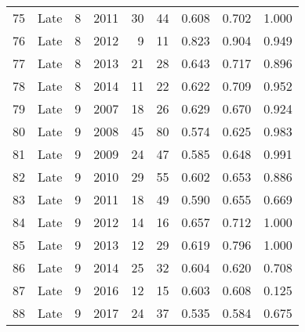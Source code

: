 \begin{table}[ht]
\begin{tabular}{rlllrrrrr}
  75 & Late & 8 & 2011 & 30 & 44 & 0.608 & 0.702 & 1.000 \\ 
  76 & Late & 8 & 2012 & 9 & 11 & 0.823 & 0.904 & 0.949 \\ 
  77 & Late & 8 & 2013 & 21 & 28 & 0.643 & 0.717 & 0.896 \\ 
  78 & Late & 8 & 2014 & 11 & 22 & 0.622 & 0.709 & 0.952 \\ 
  79 & Late & 9 & 2007 & 18 & 26 & 0.629 & 0.670 & 0.924 \\ 
  80 & Late & 9 & 2008 & 45 & 80 & 0.574 & 0.625 & 0.983 \\ 
  81 & Late & 9 & 2009 & 24 & 47 & 0.585 & 0.648 & 0.991 \\ 
  82 & Late & 9 & 2010 & 29 & 55 & 0.602 & 0.653 & 0.886 \\ 
  83 & Late & 9 & 2011 & 18 & 49 & 0.590 & 0.655 & 0.669 \\ 
  84 & Late & 9 & 2012 & 14 & 16 & 0.657 & 0.712 & 1.000 \\ 
  85 & Late & 9 & 2013 & 12 & 29 & 0.619 & 0.796 & 1.000 \\ 
  86 & Late & 9 & 2014 & 25 & 32 & 0.604 & 0.620 & 0.708 \\ 
  87 & Late & 9 & 2016 & 12 & 15 & 0.603 & 0.608 & 0.125 \\ 
  88 & Late & 9 & 2017 & 24 & 37 & 0.535 & 0.584 & 0.675 \\ 
   \hline
\end{tabular}
\end{table}
